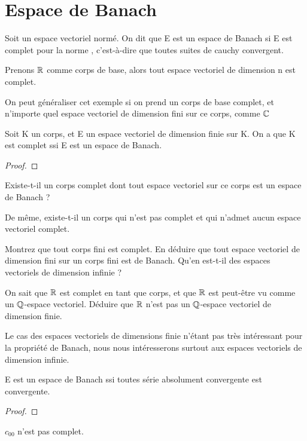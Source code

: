 \section{Espace de Banach}

\begin{definition} 
	Soit  un espace vectoriel normé. On dit que E
	est un espace de Banach si E est complet pour la norme ,
	c'est-à-dire que toutes suites de cauchy convergent.
\end{definition}

Prenons $\mathbb{R}$ comme corps de base, alors tout espace vectoriel de dimension n
est complet.

On peut généraliser cet exemple si on prend un corps de base complet, et
n'importe quel espace vectoriel de dimension fini sur ce corps, comme $\mathbb{C}$

\begin{proposition}
	Soit K un corps, et E un espace vectoriel de dimension finie sur K. On a que
	K est complet ssi E est un espace de Banach.
\end{proposition}

\begin{proof}
	
\end{proof}

\begin{question}
	Existe-t-il un corps complet dont tout espace vectoriel sur ce corps est un
	espace de Banach ?

	De même, existe-t-il un corps qui n'est pas complet et qui n'admet aucun
	espace vectoriel complet.
\end{question}

\begin{exercice}
	Montrez que tout corps fini est complet. En déduire que tout espace
	vectoriel de dimension fini sur un corps fini est de Banach. Qu'en est-t-il
	des espaces vectoriels de dimension infinie ?
\end{exercice}

\begin{exercice}
	On sait que $\mathbb{R}$ est complet en tant que corps, et que $\mathbb{R}$ est
	peut-être vu comme un $\mathbb{Q}$-espace vectoriel. Déduire que $\mathbb{R}$
	n'est pas un $\mathbb{Q}$-espace vectoriel de dimension finie.
\end{exercice}

Le cas des espaces vectoriels de dimensions finie n'étant pas très intéressant
pour la propriété de Banach, nous nous intéresserons surtout aux espaces
vectoriels de dimension infinie.

\begin{proposition}
	E est un espace de Banach ssi toutes série absolument convergente
	est convergente.
\end{proposition}

\begin{proof}
	
\end{proof}

\begin{exemple}
	$c_{00}$ n'est pas complet.
\end{exemple}
